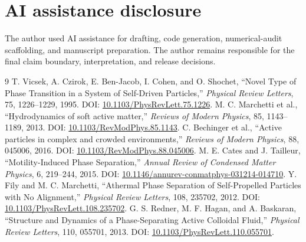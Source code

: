 \documentclass[11pt]{article}
\begin{document}
\section*{AI assistance disclosure}
The author used AI assistance for drafting, code generation, numerical-audit scaffolding, and manuscript preparation. The author remains responsible for the final claim boundary, interpretation, and release decisions.

\begin{thebibliography}{9}
 T. Vicsek, A. Czirok, E. Ben-Jacob, I. Cohen, and O. Shochet, ``Novel Type of Phase Transition in a System of Self-Driven Particles,'' \emph{Physical Review Letters}, 75, 1226--1229, 1995. DOI: \href{https://doi.org/10.1103/PhysRevLett.75.1226}{10.1103/PhysRevLett.75.1226}.
 M. C. Marchetti et al., ``Hydrodynamics of soft active matter,'' \emph{Reviews of Modern Physics}, 85, 1143--1189, 2013. DOI: \href{https://doi.org/10.1103/RevModPhys.85.1143}{10.1103/RevModPhys.85.1143}.
 C. Bechinger et al., ``Active particles in complex and crowded environments,'' \emph{Reviews of Modern Physics}, 88, 045006, 2016. DOI: \href{https://doi.org/10.1103/RevModPhys.88.045006}{10.1103/RevModPhys.88.045006}.
 M. E. Cates and J. Tailleur, ``Motility-Induced Phase Separation,'' \emph{Annual Review of Condensed Matter Physics}, 6, 219--244, 2015. DOI: \href{https://doi.org/10.1146/annurev-conmatphys-031214-014710}{10.1146/annurev-conmatphys-031214-014710}.
 Y. Fily and M. C. Marchetti, ``Athermal Phase Separation of Self-Propelled Particles with No Alignment,'' \emph{Physical Review Letters}, 108, 235702, 2012. DOI: \href{https://doi.org/10.1103/PhysRevLett.108.235702}{10.1103/PhysRevLett.108.235702}.
 G. S. Redner, M. F. Hagan, and A. Baskaran, ``Structure and Dynamics of a Phase-Separating Active Colloidal Fluid,'' \emph{Physical Review Letters}, 110, 055701, 2013. DOI: \href{https://doi.org/10.1103/PhysRevLett.110.055701}{10.1103/PhysRevLett.110.055701}.
\end{thebibliography}
\end{document}

